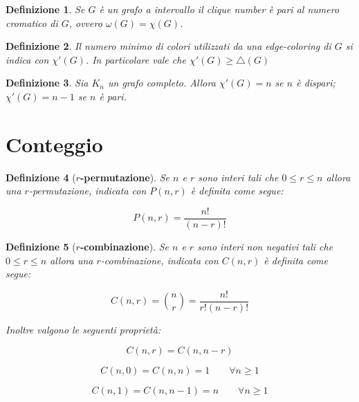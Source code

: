 \documentclass[10pt,a4paper,titlepage]{article}
\theoremstyle{break}
\newtheorem{myDef}{Definizione}
\theoremstyle{break}
\theoremstyle{break}
\begin{document}
\begin{myDef}
Se $G$ è un grafo a intervallo il \textit{clique number} è pari al numero cromatico di $G$, ovvero $\omega(G) = \chi(G)$.
\end{myDef}

\begin{myDef}
Il numero minimo di colori utilizzati da una \textit{edge-coloring} di $G$ si indica con $\chi'(G)$. In particolare vale che $\chi'(G) \geq \bigtriangleup(G)$
\end{myDef}

\begin{myDef}
Sia $K_n$ un grafo completo. Allora $\chi'(G) = n$ se $n$ è dispari; $\chi'(G) = n - 1$ se $n$ è pari.
\end{myDef}









\newpage
\section{Conteggio}

\begin{myDef}[\textbf{$r$-permutazione}]
Se $n$ e $r$ sono interi tali che $0 \leq r \leq n$ allora una $r$-permutazione, indicata con $P(n, r)$ è definita come segue:

\begin{equation}
P(n, r) = \frac{n!}{(n-r)!}
\end{equation}

\end{myDef}

\begin{myDef}[\textbf{$r$-combinazione}]
Se $n$ e $r$ sono interi non negativi tali che $0 \leq r \leq n$ allora una $r$-combinazione, indicata con $C(n, r)$ è definita come segue:

\begin{equation}
C(n, r) = \binom{n}{r} = \frac{n!}{r!(n-r)!}
\end{equation}

Inoltre valgono le seguenti proprietà:

\begin{equation}
C(n, r) = C(n, n-r)
\end{equation}

\begin{equation}
C(n, 0) = C(n, n) = 1 \qquad \forall n \geqslant 1
\end{equation}

\begin{equation}
C(n, 1) = C(n, n - 1) = n \qquad \forall n \geqslant 1
\end{equation}

\end{myDef}
\end{document}
